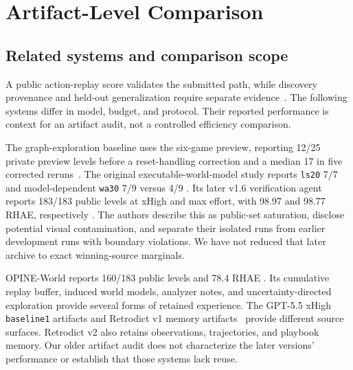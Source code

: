 \documentclass[11pt]{article}
\theoremstyle{definition}
\theoremstyle{remark}
\begin{document}
\section{Artifact-Level Comparison}
\subsection{Related systems and comparison scope}
A public action-replay score validates the submitted path, while discovery provenance
and held-out generalization require separate evidence~\cite{arcagi3,arcprize2026policy}.
The following systems differ in model, budget, and protocol. Their reported performance
is context for an artifact audit, not a controlled efficiency comparison.

The graph-exploration baseline uses the six-game preview, reporting 12/25 private
preview levels before a reset-handling correction and a median 17 in five corrected
reruns~\cite{arcagi3graph}. The original executable-world-model study reports
\texttt{ls20} 7/7 and model-dependent \texttt{wa30} 7/9 versus 4/9
\cite{arcagi3worldmodels}. Its later v1.6 verification agent reports 183/183 public
levels at xHigh and max effort, with 98.97 and 98.77 RHAE, respectively
\cite{rodionov2026ablations}. The authors describe this as public-set saturation,
disclose potential visual contamination, and separate their isolated runs from earlier
development runs with boundary violations. We have not reduced that later archive
to exact winning-source marginals.

OPINE-World reports 160/183 public levels and 78.4 RHAE
\cite{courtis2026opine}. Its cumulative replay buffer, induced world models, analyzer
notes, and uncertainty-directed exploration provide several forms of retained
experience. The GPT-5.5 xHigh \texttt{baseline1} artifacts and Retrodict v1 memory
artifacts~\cite{arcagi3worldmodels,brown2026retrodict} provide different source
surfaces. Retrodict v2 also retains observations, trajectories, and playbook memory.
Our older artifact audit does not characterize the later versions' performance or
establish that those systems lack reuse.
\end{document}
